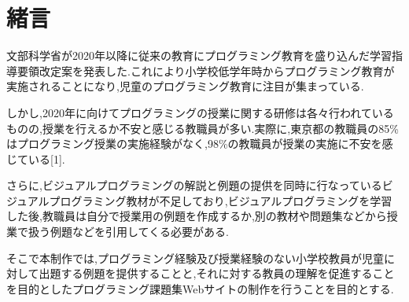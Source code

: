 \newpage

\section{\rm 緒言}
文部科学省が2020年以降に従来の教育にプログラミング教育を盛り込んだ学習指導要領改定案を発表した.これにより小学校低学年時からプログラミング教育が実施されることになり,児童のプログラミング教育に注目が集まっている.

しかし,2020年に向けてプログラミングの授業に関する研修は各々行われているものの,授業を行えるか不安と感じる教職員が多い.実際に,東京都の教職員の85\%はプログラミング授業の実施経験がなく,98\%の教職員が授業の実施に不安を感じている[1].

さらに,ビジュアルプログラミングの解説と例題の提供を同時に行なっているビジュアルプログラミング教材が不足しており,ビジュアルプログラミングを学習した後,教職員は自分で授業用の例題を作成するか,別の教材や問題集などから授業で扱う例題などを引用してくる必要がある.

そこで本制作では,プログラミング経験及び授業経験のない小学校教員が児童に対して出題する例題を提供することと,それに対する教員の理解を促進することを目的としたプログラミング課題集Webサイトの制作を行うことを目的とする.
